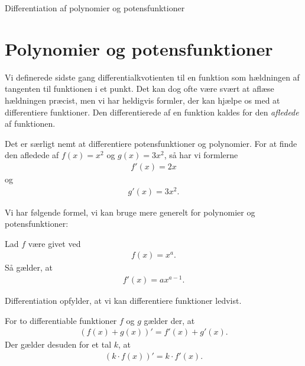 \documentclass[12pt]{article}
\begin{document}



\begin{center}
\Huge
Differentiation af polynomier og potensfunktioner
\end{center}
\section*{Polynomier og potensfunktioner}

Vi definerede sidste gang differentialkvotienten til en funktion som hældningen af tangenten til funktionen i et punkt. Det kan dog ofte være svært at aflæse hældningen præcist, men vi har heldigvis formler, der kan hjælpe os med at differentiere funktioner. Den differentierede af en funktion kaldes for den \textit{afledede} af funktionen. 

\begin{exa}
	Det er særligt nemt at differentiere potensfunktioner og polynomier. For at finde den afledede af $f(x) = 
	x^2$ og $g(x) = 3x^2$, så har vi formlerne
	\begin{align*}
		f'(x) = 2x
	\end{align*}
	og 
	\begin{align*}
		g'(x) = 3x^2.
	\end{align*}
\end{exa}

Vi har følgende formel, vi kan bruge mere generelt for polynomier og potensfunktioner:

\begin{setn}
	Lad $f$ være givet ved
	\begin{align*}
		f(x) = x^a.
	\end{align*}
	Så gælder, at 
	\begin{align*}
		f'(x) = ax^{a-1}.
	\end{align*}
\end{setn}

Differentiation opfylder, at vi kan differentiere funktioner ledvist.
\begin{setn}[Linearitet]
	For to differentiable funktioner $f$ og $g$ gælder der, at 
	\begin{align*}
		(f(x)+g(x))' = f'(x) + g'(x).
	\end{align*}
	Der gælder desuden for et tal $k$, at
	\begin{align*}
		(k\cdot f(x) )' = k\cdot f'(x).
	\end{align*}
\end{setn}
\end{document}
